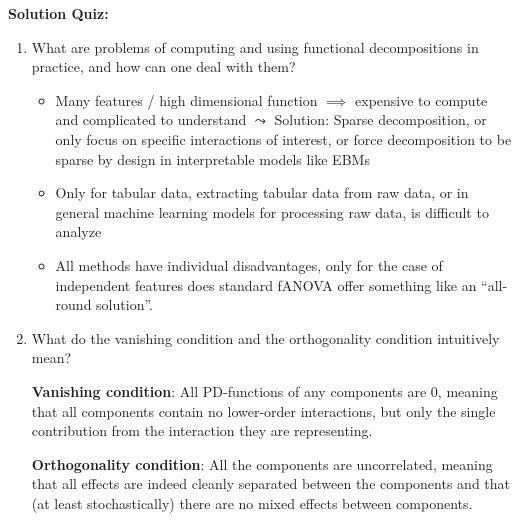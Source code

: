\textbf{Solution Quiz:}\\\noindent
\medskip

\begin{enumerate}

    \item
    What are problems of computing and using functional decompositions in practice, and how can one deal with them?
    
    \begin{itemize}
    
        \item 
        Many features / high dimensional function $\implies$ expensive to compute and complicated to understand $\leadsto$ Solution: Sparse decomposition, or only focus on specific interactions of interest, or force decomposition to be sparse by design in interpretable models like EBMs
        \item 
        Only for tabular data, extracting tabular data from raw data, or in general machine learning models for processing raw data, is difficult to analyze
        \item 
        All methods have individual disadvantages, only for the case of independent features does standard fANOVA offer something like an ``all-round solution''.
        
    \end{itemize}
    
    \item 
    What do the vanishing condition and the orthogonality condition intuitively mean?
    
    \begin{itemize}
    
        \textbf{Vanishing condition}: All PD-functions of any components are 0, meaning that all components contain no lower-order interactions, but only the single contribution from the interaction they are representing.
    
        \textbf{Orthogonality condition}: All the components are uncorrelated, meaning that all effects are indeed cleanly separated between the components and that (at least stochastically) there are no mixed effects between components.
    
    \end{itemize}
    
\end{enumerate}